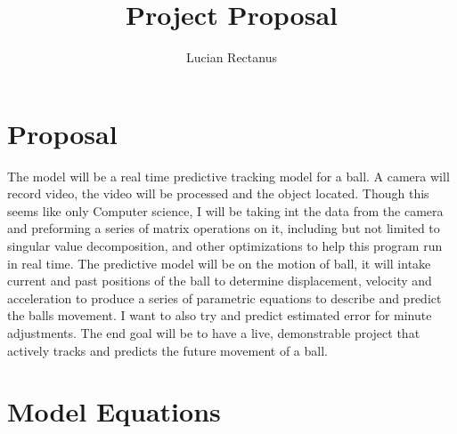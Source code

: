 \documentclass[stu,12pt,floatsintext]{apa7}
\title{Project Proposal}
\author{Lucian Rectanus}
\affiliation{Frostburg State University}
\begin{document}
\maketitle %



\section{Proposal}
The model will be a real time predictive tracking model for a ball. A camera will record video, the video will be processed and the object located. Though this seems like only Computer science, I will be taking int the data from the camera and preforming a series of matrix operations on it, including but not limited to singular value decomposition, and other optimizations to help this program run in real time. The predictive model will be on the motion of ball, it will intake current and past positions of the ball to determine displacement, velocity and acceleration to produce a series of parametric equations to describe and predict the balls movement. I want to also try and predict estimated error for minute adjustments. The end goal will be to have a live, demonstrable project that actively tracks and predicts the future movement of a ball.

\section{Model Equations}
\end{document}

